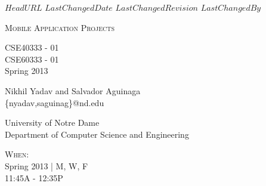 \svnidlong
{$HeadURL$}
{$LastChangedDate$}
{$LastChangedRevision$}
{$LastChangedBy$}

\thispagestyle{titlepage}

\begin{center}
  \newlength{\parSepLength}
  \setlength{\parSepLength}{10ex}

  \Large
  \centering

  \thinRule\par
  \par\vspace{0.15\parSepLength}
  \begin{minipage}{\textwidth}
    \centering
    \fontsize{40pt}{36pt}\selectfont\titleColor\scshape
    Mobile Application Projects\\
    
  \end{minipage}
  \par\vspace{0.25\parSepLength}
  \par\thinRule

  \vspace{0.125\parSepLength}

  \begin{minipage}{\textwidth}
    \centering
    \large
    CSE40333 - 01 \\
    CSE60333 - 01 \\
    Spring 2013\\
    
  \end{minipage}

  \vfill

  \begin{minipage}{\textwidth}
    \centering
    \Large
    Nikhil Yadav and Salvador Aguinaga\\
    \{nyadav,saguinag\}@nd.edu
  \end{minipage}

  \vfill

  \begin{minipage}{0.8\textwidth}
    \centering
    \small

    \begin{minipage}[t]{0.45\textwidth}
	University of Notre Dame \\
	Department of Computer Science and Engineering\\
	
    \end{minipage}
    \hfill
    \begin{minipage}[t]{0.45\textwidth}
      \raggedleft
      \textsc{When:} \\
      Spring 2013 | M, W, F\\
      11:45A - 12:35P
    \end{minipage}
  \end{minipage}
\end{center}

